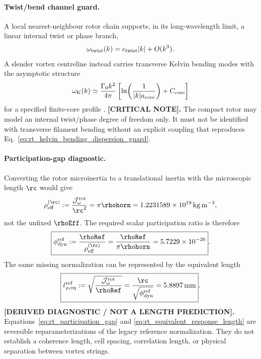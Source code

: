 \paragraph{Twist/bend channel guard.}
A local nearest-neighbour rotor chain supports, in its long-wavelength limit,
a linear internal twist or phase branch,
\begin{align}
    \omega_{\rm twist}(k)
    =
    c_{\rm twist}|k|+O(k^3).
\end{align}
A slender vortex centreline instead carries transverse Kelvin bending modes
with the asymptotic structure
\begin{align}
    \omega_{\rm K}(k)
    \simeq
    \frac{\Gamma_0k^2}{4\pi}
    \left[
        \ln\!\left(\frac{1}{|k|a_{\rm core}}\right)
        +C_{\rm core}
    \right]
    \label{eq:rt_kelvin_bending_dispersion_guard}
\end{align}
for a specified finite-core profile \cite{Saffman1992}.
\textbf{[CRITICAL NOTE].}
The compact rotor may model an internal twist/phase degree of freedom only.
It must not be identified with transverse filament bending without an explicit
coupling that reproduces Eq.~\eqref{eq:rt_kelvin_bending_dispersion_guard}.

\paragraph{Participation-gap diagnostic.}
Converting the rotor microinertia to a translational inertia with the
microscopic length $\rc$ would give
\begin{align}
    \rho_{\rm eff}^{(\rc)}
    :=
    \frac{\mathcal J_{\omega}^{\rm rot}}{\rc^2}
    =
    \pi\rhohorn
    =
    1.2231589\times10^{19}\,\mathrm{kg\,m^{-3}},
    \label{eq:rt_rc_scale_effective_inertia}
\end{align}
not the unfixed $\rhoEff$.  The required scalar participation ratio is
therefore
\begin{align}
    \boxed{
    \phi_{\rm dyn}^{\rm ref}
    :=
    \frac{\rhoRef}{\rho_{\rm eff}^{(\rc)}}
    =
    \frac{\rhoRef}{\pi\rhohorn}
    =
    5.7229\times10^{-26}
    }.
    \label{eq:rt_participation_gap}
\end{align}
The same missing normalization can be represented by the equivalent length
\begin{align}
    \boxed{
    \ell_{\rho,\rm eq}^{\rm ref}
    :=
    \sqrt{\frac{\mathcal J_{\omega}^{\rm rot}}{\rhoRef}}
    =
    \frac{\rc}{\sqrt{\phi_{\rm dyn}^{\rm ref}}}
    =
    5.8897\,\mathrm{mm}
    }.
    \label{eq:rt_equivalent_response_length}
\end{align}
\textbf{[DERIVED DIAGNOSTIC / NOT A LENGTH PREDICTION].}
Equations~\eqref{eq:rt_participation_gap} and
\eqref{eq:rt_equivalent_response_length} are reversible reparameterizations
of the legacy reference normalization.  They do not establish a coherence length, cell
spacing, correlation length, or physical separation between vortex strings.

